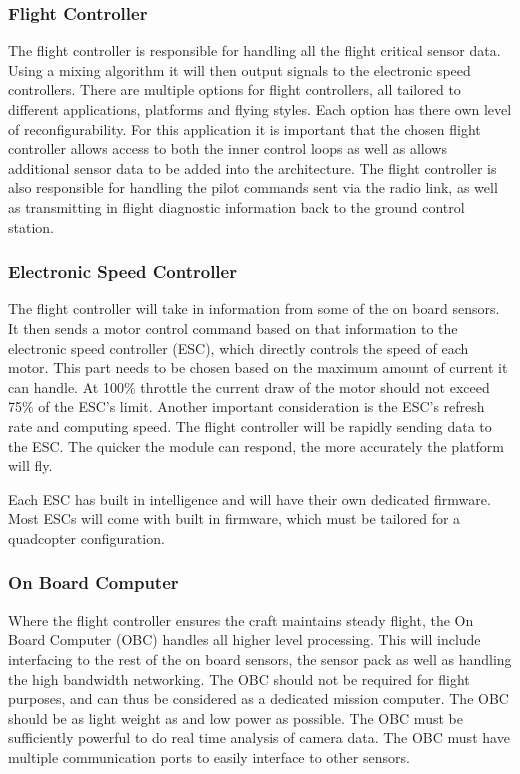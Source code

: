 			\subsubsection{Flight Controller}
			The flight controller is responsible for handling all the flight critical sensor data. Using a mixing algorithm it will then output signals to the electronic speed controllers. There are multiple options for flight controllers, all tailored to different applications, platforms and flying styles. Each option has there own level of reconfigurability. For this application it is important that the chosen flight controller allows access to both the inner control loops as well as allows additional sensor data to be added into the architecture. The flight controller is also responsible for handling the pilot commands sent via the radio link, as well as transmitting in flight diagnostic information back to the ground control station.
			
			\subsubsection{Electronic Speed Controller}
			The flight controller will take in information from some of the on board sensors. It then sends a motor control command based on that information to the electronic speed controller (ESC), which directly controls the speed of each motor. This part needs to be chosen based on the maximum amount of current it can handle. At 100\% throttle the current draw of the motor should not exceed 75\% of the ESC's limit. Another important consideration is the ESC's refresh rate and computing speed. The flight controller will be rapidly sending data to the ESC. The quicker the module can respond, the more accurately the platform will fly. 
			
			Each ESC has built in intelligence and will have their own dedicated firmware. Most ESCs will come with built in firmware, which must be tailored for a quadcopter configuration.
			
			\subsubsection{On Board Computer}
			Where the flight controller ensures the craft maintains steady flight, the On Board Computer (OBC) handles all higher level processing. This will include interfacing to the rest of the on board sensors, the sensor pack as well as handling the high bandwidth networking. The OBC should not be required for flight purposes, and can thus be considered as a dedicated mission computer. 
			The OBC should be as light weight as and low power as possible. The OBC must be sufficiently powerful to do real time analysis of camera data. The OBC must have multiple communication ports to easily interface to other sensors.
			
